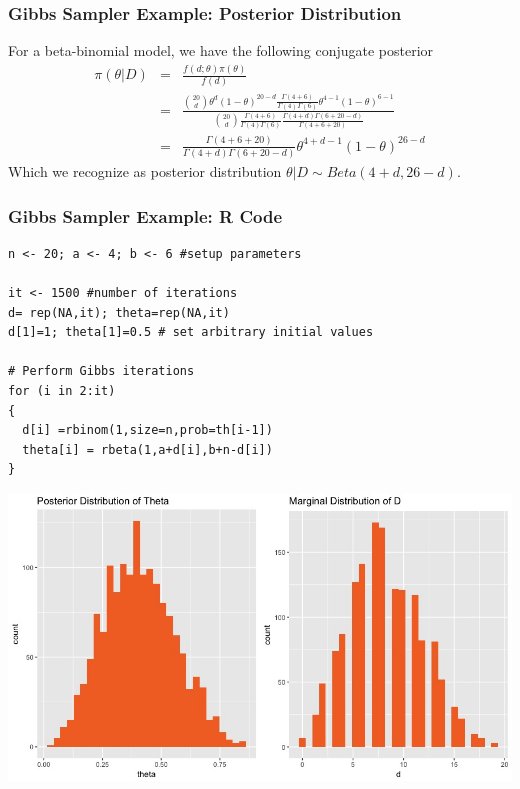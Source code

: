\documentclass{beamer}
\begin{document}
\begin{frame}
\frametitle{Gibbs Sampler Example: Posterior Distribution}
For a beta-binomial model, we have the following conjugate posterior
\begin{eqnarray*}
\pi(\theta|D) &=& \frac{f(d;\theta)\pi(\theta)}{f(d)} \\
&=& \frac{{20 \choose d}\theta^{d}(1-\theta)^{20-d} \frac{\Gamma(4 + 6)}{\Gamma(4)\Gamma(6)}\theta^{4-1}(1-\theta)^{6-1}}{{20 \choose d} \frac{\Gamma(4 + 6)}{\Gamma(4)\Gamma(6)} \frac{\Gamma(4 + d)\Gamma(6 + 20 - d)}{\Gamma(4+6+20)}} \\
&=& \frac{\Gamma(4+6+20)}{\Gamma(4 + d)\Gamma(6 + 20 - d)}\theta^{4+d-1}(1-\theta)^{26-d} 
\end{eqnarray*}
Which we recognize as posterior distribution $\theta|D \sim Beta(4+d, 26-d)$. 
\end{frame}

\begin{frame}[fragile]
\frametitle{Gibbs Sampler Example: R Code\footnotemark}
\begin{verbatim}
n <- 20; a <- 4; b <- 6 #setup parameters

it <- 1500 #number of iterations
d= rep(NA,it); theta=rep(NA,it) 
d[1]=1; theta[1]=0.5 # set arbitrary initial values

# Perform Gibbs iterations
for (i in 2:it)
{
  d[i] =rbinom(1,size=n,prob=th[i-1])
  theta[i] = rbeta(1,a+d[i],b+n-d[i])
}
\end{verbatim}
\end{frame}

\begin{frame}
\begin{center}
\includegraphics[scale=0.35]{Rplot.jpeg}
\end{center}
\end{frame}
\end{document}

